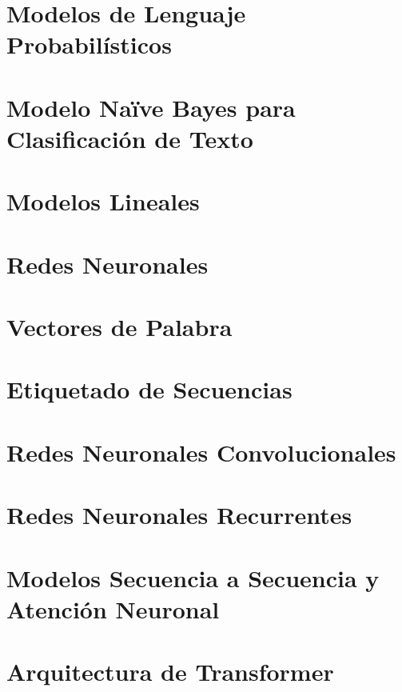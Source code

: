 \documentclass{book}
\begin{document}
\chapter{Modelos de Lenguaje Probabilísticos}
\label{cap_plm}



\chapter{Modelo Naïve Bayes para Clasificación de Texto}
\label{cap_nb}



\chapter{Modelos Lineales}
\label{cap_lineales}



\chapter{Redes Neuronales}
\label{cap_redes}


\chapter{Vectores de Palabra}
\label{cap_embeddings}


\chapter{Etiquetado de Secuencias}
\label{cap_etisec}




\chapter{Redes Neuronales Convolucionales}
\label{cap_cnn}



\chapter{Redes Neuronales Recurrentes}
\label{cap_rnn}




\chapter{Modelos Secuencia a Secuencia y Atención Neuronal}
\label{cap_sec}



\chapter{Arquitectura de Transformer}
\label{cap_trans}

\end{document}
